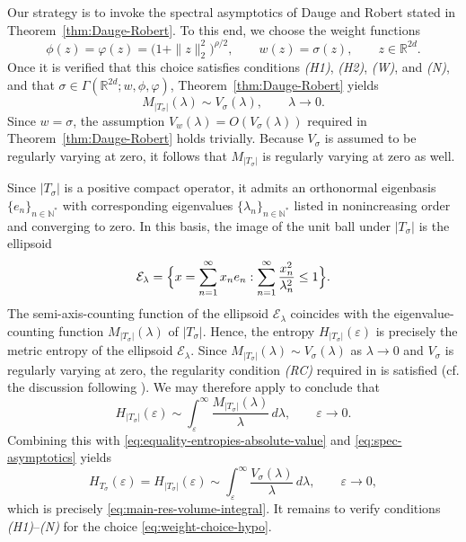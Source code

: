 \documentclass[a4paper,12pt]{article}
\newcommand{\N}{\mathbb{N}}
\newcommand{\R}{\mathbb{R}}
\begin{document}
Our strategy is to invoke the spectral asymptotics of
Dauge and Robert stated in Theorem~\ref{thm:Dauge-Robert}.
To this end, we choose the weight functions
\begin{equation}\label{eq:weight-choice-hypo}
    \phi(z)
    = \varphi(z)
    = \bigl(1+\|z\|_2^2\bigr)^{\rho/2},
    \qquad
    w(z)=\sigma(z),
    \qquad z\in\R^{2d}.
\end{equation}
Once it is verified that this choice satisfies conditions
\emph{(H1)}, \emph{(H2)}, \emph{(W)}, and \emph{(N)}, and that
$\sigma\in\Gamma(\R^{2d};w,\phi,\varphi)$,
Theorem~\ref{thm:Dauge-Robert} yields
\begin{equation}\label{eq:spec-asymptotics}
M_{|T_\sigma|}(\lambda)
\sim
V_\sigma(\lambda),
\qquad \lambda\to0.
\end{equation}
Since $w=\sigma$, the assumption
$V_w(\lambda)=O(V_\sigma(\lambda))$ required in
Theorem~\ref{thm:Dauge-Robert} holds trivially.
Because $V_\sigma$ is assumed to be regularly varying at zero,
it follows that $M_{|T_\sigma|}$ is regularly varying at zero as well.


Since $|T_\sigma|$ is a positive compact operator,
it admits an orthonormal eigenbasis
$\{e_n\}_{n\in\N^*}$ with corresponding eigenvalues
$\{\lambda_n\}_{n\in\N^*}$ listed in nonincreasing order
and converging to zero.
In this basis, the image of the unit ball under $|T_\sigma|$
is the ellipsoid
\[
\mathcal E_\lambda
=
\Bigl\{
x=\sum_{n=1}^\infty x_n e_n :
\sum_{n=1}^\infty \frac{x_n^2}{\lambda_n^2}\le 1
\Bigr\}.
\]
The semi-axis-counting function of the ellipsoid $\mathcal E_\lambda$
coincides with the eigenvalue-counting function $M_{|T_\sigma|}(\lambda)$ of $|T_\sigma|$.
Hence, the entropy $H_{|T_\sigma|}(\varepsilon)$ is precisely the
metric entropy of the ellipsoid $\mathcal E_\lambda$.
Since $M_{|T_\sigma|}(\lambda)\sim V_\sigma(\lambda)$ as
$\lambda\to0$ and $V_\sigma$ is regularly varying at zero,
the regularity condition \emph{(RC)} required in
\cite[Theorem~2]{allard2025metricentropyminimaxrisk}
is satisfied (cf. the discussion following \cite[Lemma~10]{allard2025metricentropyminimaxrisk}).
We may therefore apply \cite[Theorem~2]{allard2025metricentropyminimaxrisk}
to conclude that
\[
H_{|T_\sigma|}(\varepsilon)
\sim
\int_{\varepsilon}^{\infty}
\frac{M_{|T_\sigma|}(\lambda)}{\lambda}\,d\lambda,
\qquad \varepsilon\to0.
\]
Combining this with \eqref{eq:equality-entropies-absolute-value} and \eqref{eq:spec-asymptotics} yields
\begin{equation}\label{eq:mainr-result-for-Weyl-1}
H_{T_\sigma}(\varepsilon)
=
H_{|T_\sigma|}(\varepsilon)
\sim
\int_{\varepsilon}^{\infty}
\frac{V_\sigma(\lambda)}{\lambda}\,d\lambda,
\qquad \varepsilon\to0,
\end{equation}
which is precisely \eqref{eq:main-res-volume-integral}.
It remains to verify conditions \emph{(H1)}–\emph{(N)}
for the choice \eqref{eq:weight-choice-hypo}.
\end{document}
